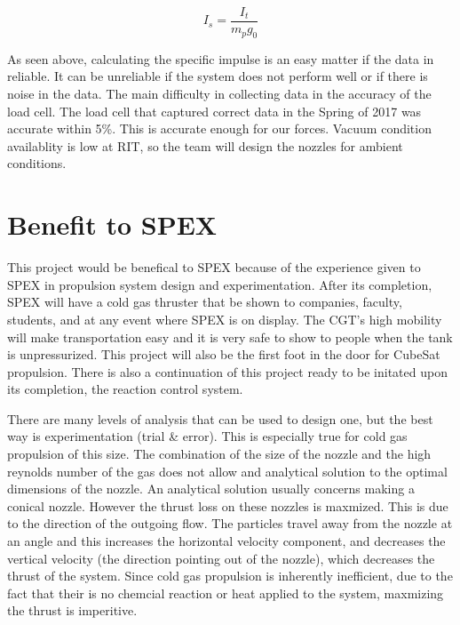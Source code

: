 \documentclass[conference]{IEEEtran} %
\begin{document}
\begin{equation} \label{specific impulse}
  I_s = \frac{I_t}{m_p g_0}
\end{equation}

As seen above, calculating the specific impulse is
an easy matter if the data in reliable. It can be unreliable if the system does not perform well or if there is noise in the data. The main difficulty in collecting data in the accuracy of
the load cell. The load cell that captured correct data in the Spring of 2017 was accurate within 5\%. This is accurate enough for our forces.
Vacuum condition availablity is low at RIT, so the team will design the nozzles for ambient conditions.




\section{Benefit to SPEX}
\label{sec:benefit}

This project would be benefical to SPEX because of the experience given to SPEX in propulsion system design and experimentation. After its completion, SPEX will have a cold gas thruster that
be shown to companies, faculty, students, and at any event where SPEX is on display. The CGT's high mobility will make transportation easy and it is very safe to show to people when the tank is unpressurized. This project
will also be the first foot in the door for CubeSat propulsion. There is also a continuation of this project ready to be initated upon its completion, the
reaction control system.

There are many levels of
analysis that can be used to design one, but the best way is experimentation (trial \& error). This is especially true for cold gas propulsion of this
size. The combination of the size of the nozzle and the high reynolds number of the gas does not allow and analytical solution to the optimal dimensions
of the nozzle. An analytical solution usually concerns making a conical nozzle. However the thrust loss on these nozzles is maxmized. This is due to the
direction of the outgoing flow. The particles travel away from the nozzle at an angle and this increases the horizontal velocity component, and decreases the
vertical velocity (the direction pointing out of the nozzle), which decreases the thrust of the system. Since cold gas propulsion is inherently inefficient, due
to the fact that their is no chemcial reaction or heat applied to the system, maxmizing the thrust is imperitive.
\end{document}
